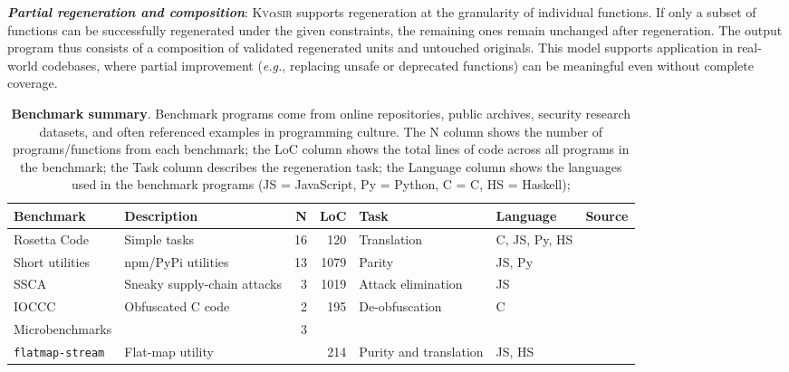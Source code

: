 \documentclass[nonacm,sigplan]{acmart}
\def\eg{{\em e.g.}, }
\newcommand{\sys}{{\scshape Kv{$\alpha$}sir}\xspace}
\newcommand{\heading}[1]{\vspace{2pt}\noindent\textbf{\emph{#1}}:\enspace}
\newcommand{\ttt}[1]{\texttt{#1}\xspace}
\begin{document}
\heading{Partial regeneration and composition}
\sys supports regeneration at the granularity of individual functions.
If only a subset of functions can be successfully regenerated under the given constraints, the remaining ones remain unchanged after regeneration.
The output program thus consists of a composition of validated regenerated units and untouched originals.
This model supports application in real-world codebases, where partial improvement (\eg replacing unsafe or deprecated functions) can be meaningful even without complete coverage.

\begin{table}[t]
\centering
  \caption{\textbf{Benchmark summary}. 
  Benchmark programs come from online repositories, public archives, security research datasets, and often referenced examples in programming culture.
The N column shows the number of programs/functions from each benchmark;
the LoC column shows the total lines of code across all programs in the benchmark;
the Task column describes the regeneration task;
  the Language column shows the languages used in the benchmark programs (JS = JavaScript, Py = Python, C = C, HS = Haskell);
}
  \begin{tabular*}{\textwidth}{llrrlll}
\toprule
    Benchmark                          & Description                              & N  & LoC & Task               & Language & Source \\
\midrule
Rosetta Code                       & Simple tasks                             & 16 & 120 & Translation            & C, JS, Py, HS & \cite{rosettacode} \\
Short utilities                    & npm/PyPi utilities                       & 13 & 1079& Parity                 & JS, Py & \cite{regbench2025} \\
SSCA                               & Sneaky supply-chain attacks              & 3  & 1019& Attack elimination     & JS & \cite{ev:eurosec:2022, ohm2020backstabber,copeland2019frightening} \\
IOCCC                              & Obfuscated C code                        & 2  & 195 & De-obfuscation         & C & \cite{ioccc} \\
Microbenchmarks                    &                                          & 3  &     &                        & & \\
\hspace{.5em} \ttt{flatmap-stream} & Flat-map utility                         &    & 214 & Purity and translation & JS, HS & \cite{es1}  \\

\end{tabular*}
\end{table}
\end{document}
